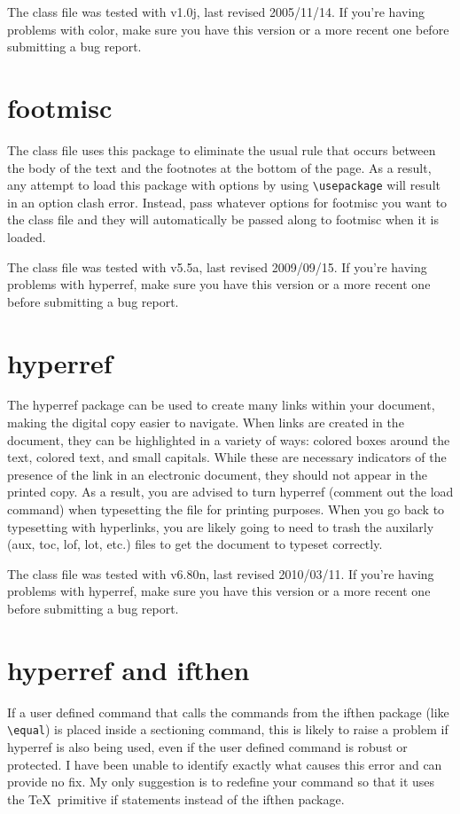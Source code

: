 The class file was tested with v1.0j, last revised 2005/11/14.  If you're having problems with color, make sure you have this version or a more recent one before submitting a bug report.

\section{footmisc}
The class file uses this package to eliminate the usual rule that occurs between the body of the text and the footnotes at the bottom of the page.  As a result, any attempt to load this package with options by using \verb=\usepackage= will result in an option clash error.  Instead, pass whatever options for footmisc you want to the class file and they will automatically be passed along to footmisc when it is loaded.

The class file was tested with v5.5a, last revised 2009/09/15.  If you're having problems with hyperref, make sure you have this version or a more recent one before submitting a bug report.

\section{hyperref}
The hyperref package can be used to create many links within your document, making the digital copy easier to navigate.  When links are created in the document, they can be highlighted in a variety of ways: colored boxes around the text, colored text, and small capitals.  While these are necessary indicators of the presence of the link in an electronic document, they should not appear in the printed copy.  As a result, you are advised to turn hyperref (comment out the load command) when typesetting the file for printing purposes.  When you go back to typesetting with hyperlinks, you are likely going to need to trash the auxilarly (aux, toc, lof, lot, etc.) files to get the document to typeset correctly.

The class file was tested with v6.80n, last revised 2010/03/11.  If you're having problems with hyperref, make sure you have this version or a more recent one before submitting a bug report.

\section{hyperref and ifthen}
If a user defined command that calls the commands from the ifthen package (like \verb=\equal=) is placed inside a sectioning command, this is likely to raise a problem if hyperref is also being used, even if the user defined command is robust or protected.  I have been unable to identify exactly what causes this error and can provide no fix.  My only suggestion is to redefine your command so that it uses the \TeX\ primitive if statements instead of the ifthen package.

